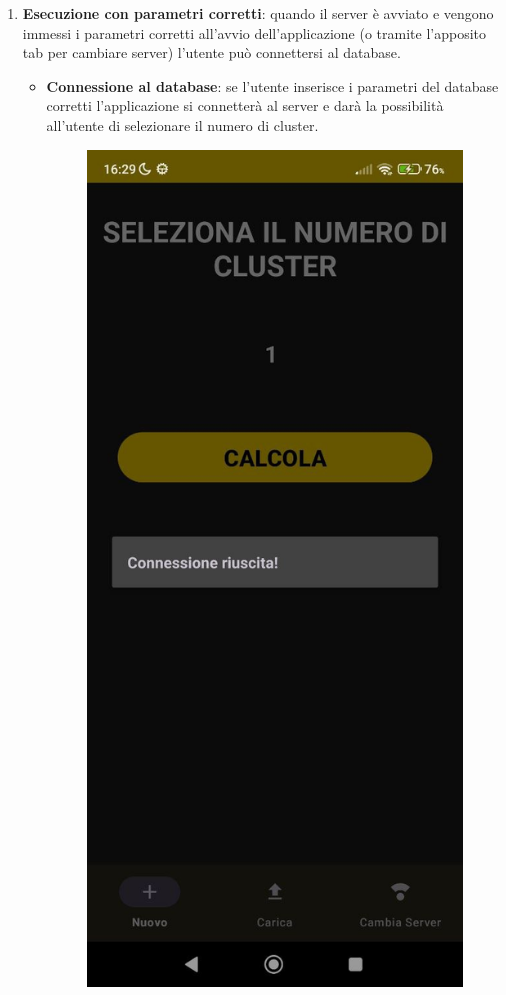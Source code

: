 \begin{enumerate}
\begin{figure}[H]
  \end{figure}
  \item \textbf{Esecuzione con parametri corretti}: quando il server è avviato e vengono immessi i parametri corretti all'avvio dell'applicazione (o tramite l'apposito tab per cambiare server) l'utente può connettersi al database. 
  \begin{itemize}[label=-]
    \item \textbf{Connessione al database}: se l'utente inserisce i parametri del database corretti l'applicazione si connetterà al server e darà la possibilità all'utente di selezionare il numero di cluster.
    \begin{figure}[H]
      \centering
      \includegraphics[scale=0.2]{img/app4.png}

\end{figure}
\end{itemize}
\end{enumerate}
